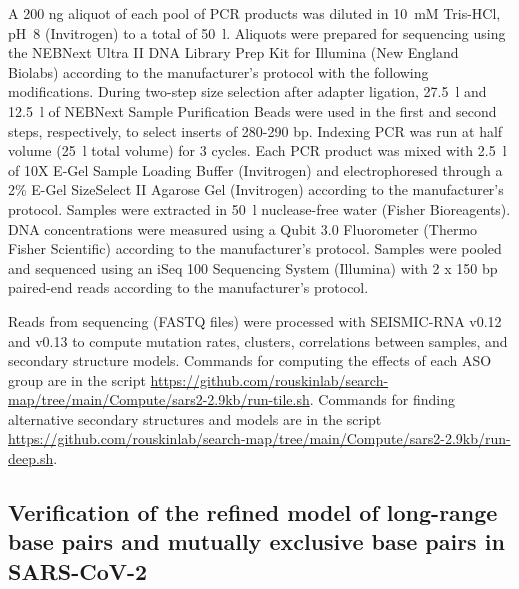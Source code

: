 \documentclass[main.tex]{subfiles}
\begin{document}
A 200 ng aliquot of each pool of PCR products was diluted in 10~mM Tris-HCl, pH~8 (Invitrogen) to a total of 50~\textmu l.
Aliquots were prepared for sequencing using the NEBNext Ultra II DNA Library Prep Kit for Illumina (New England Biolabs) according to the manufacturer's protocol with the following modifications.
During two-step size selection after adapter ligation, 27.5~\textmu l and 12.5~\textmu l of NEBNext Sample Purification Beads were used in the first and second steps, respectively, to select inserts of 280-290 bp.
Indexing PCR was run at half volume (25~\textmu l total volume) for 3 cycles.
Each PCR product was mixed with 2.5~\textmu l of 10X E-Gel Sample Loading Buffer (Invitrogen) and electrophoresed through a 2\% E-Gel SizeSelect II Agarose Gel (Invitrogen) according to the manufacturer's protocol.
Samples were extracted in 50~\textmu l nuclease-free water (Fisher Bioreagents).
DNA concentrations were measured using a Qubit 3.0 Fluorometer (Thermo Fisher Scientific) according to the manufacturer's protocol.
Samples were pooled and sequenced using an iSeq 100 Sequencing System (Illumina) with 2 x 150 bp paired-end reads according to the manufacturer's protocol.

Reads from sequencing (FASTQ files) were processed with SEISMIC-RNA v0.12 and v0.13 to compute mutation rates, clusters, correlations between samples, and secondary structure models.
Commands for computing the effects of each ASO group are in the script \url{https://github.com/rouskinlab/search-map/tree/main/Compute/sars2-2.9kb/run-tile.sh}.
Commands for finding alternative secondary structures and models are in the script \url{https://github.com/rouskinlab/search-map/tree/main/Compute/sars2-2.9kb/run-deep.sh}.


\subsection{Verification of the refined model of long-range base pairs and mutually exclusive base pairs in SARS-CoV-2}
\end{document}
